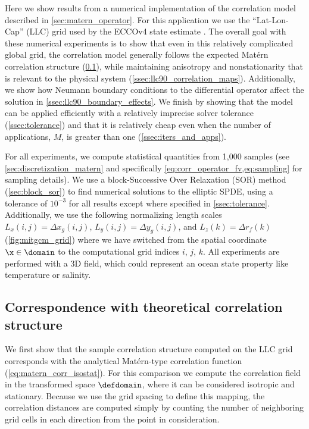 \documentclass[alpha-refs]{wiley-article}
\begin{document}
Here we show results from a numerical implementation of the correlation model
described in \cref{sec:matern_operator}.
For this application we use the ``Lat-Lon-Cap'' (LLC) grid used by the ECCOv4
state estimate \citep[see their Section 2 of][for a complete description of the grid]{forgetECCOv4}.
The overall goal with these numerical experiments is to show that even in this
relatively complicated global grid, the
correlation model generally follows the expected Mat\'ern correlation structure
(\cref{ssec:llc90_correlations}), while maintaining
anisotropy and nonstationarity that is relevant to the physical system
(\cref{ssec:llc90_correlation_maps}).
Additionally, we show how Neumann boundary conditions to the differential
operator affect the solution in \cref{ssec:llc90_boundary_effects}.
We finish
by showing that the model can be applied efficiently with a relatively imprecise
solver tolerance (\cref{ssec:tolerance}) and that it is relatively cheap even
when the number of applications, $M$, is greater than one
(\cref{ssec:iters_and_apps}).

For all experiments, we compute statistical quantities from 1,000 samples
(see \cref{sec:discretization_matern} and specifically
\cref{eq:corr_operator_fv,eq:sampling} for sampling details).
We use a block-Successive Over Relaxation (SOR) method (\cref{sec:block_sor}) to find numerical
solutions to the elliptic SPDE, using a tolerance of $10^{-3}$ for all results
except where specified in \cref{ssec:tolerance}.
Additionally, we use the following normalizing length scales
$L_x(i,j) = \Delta x_g(i,j)$, $L_y(i,j) = \Delta y_g(i,j)$,
and $L_z(k) = \Delta r_f(k)$ (\cref{fig:mitgcm_grid}) where we have switched
from the spatial coordinate $\x\in\domain$ to the computational grid indices $i$, $j$, $k$.
All experiments are performed with a 3D field, which could represent an ocean
state property like temperature or salinity.

\subsection{Correspondence with theoretical correlation structure}
\label{ssec:llc90_correlations}

We first show that the sample correlation structure computed on the LLC
grid corresponds with the analytical Mat\'ern-type correlation function
(\cref{eq:matern_corr_isostat}).
For this comparison we compute the correlation field in the transformed space
$\defdomain$, where it can be considered isotropic and stationary.
Because we use the grid spacing to define this mapping, the correlation
distances are computed simply by counting the number of neighboring grid cells in each
direction from the point in consideration.
\end{document}
